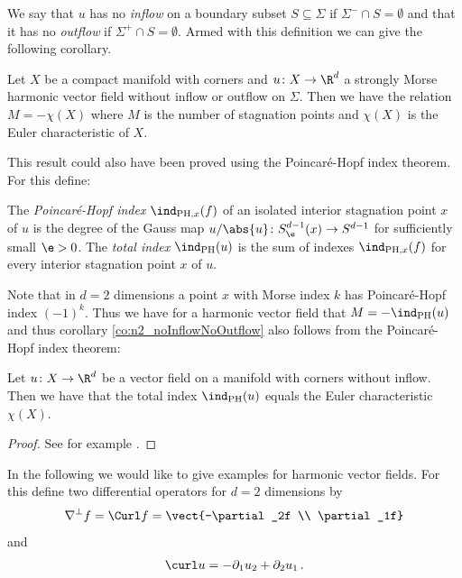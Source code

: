 We say that $u$ has no \emph{inflow} on a boundary subset $S\subseteq\Sigma$ if $\Sigma^-\cap S=\emptyset$ and
that it has no \emph{outflow} if $\Sigma^+\cap S=\emptyset$.
Armed with this definition we can give the following corollary.
\begin{corollary}\label{co:n2_noInflowNoOutflow}
  Let $X$ be a compact manifold with corners and $u\colon X\to\R^d$ a strongly Morse
  harmonic vector field without inflow or outflow on
  $\Sigma$. Then we have the relation $M=-\chi(X)$ where $M$ is the number of stagnation points
  and $\chi(X)$ is the Euler characteristic of $X$.
\end{corollary}
This result could also have been proved using the Poincaré-Hopf index theorem.
For this define:
\begin{definition}
  The \emph{Poincaré-Hopf index} $\ind_{\text{PH},x}(f)$ of an isolated
  interior stagnation point $x$ of $u$ is the degree of the Gauss map $u/\abs{u}\colon S^{d-1}_\e(x)\to S^{d-1}$
   for sufficiently small $\e>0$.
  The \emph{total index} $\ind_{\text{PH}}(u)$ is the sum of indexes $\ind_{\text{PH},x}(f)$
  for every interior stagnation point $x$ of $u$.
\end{definition}
Note that in $d=2$ dimensions a point $x$ with Morse index $k$ has Poincaré-Hopf index $(-1)^k$.
Thus we have for a harmonic vector field that $M=-\ind_\text{PH}(u)$ and thus corollary \ref{co:n2_noInflowNoOutflow}
also follows from the Poincaré-Hopf index theorem:
\begin{theorem}
  Let $u\colon X\to\R^d$ be a vector field on a manifold with corners without inflow. Then we have
  that the total index $\ind_\text{PH}(u)$ equals the Euler characteristic $\chi(X)$.
\end{theorem}
\begin{proof}
  See for example \cite[§6]{Milnor1965}.
\end{proof}


In the following we would like to give examples for harmonic vector fields.
For this define two differential operators for $d=2$ dimensions by
\begin{align*}
  \nabla^\perp f=\Curl f=\vect{-\partial_2f \\ \partial_1f}
\end{align*}
and
\begin{align*}
  \curl u=-\partial_1u_2+\partial_2u_1\,.
\end{align*}

